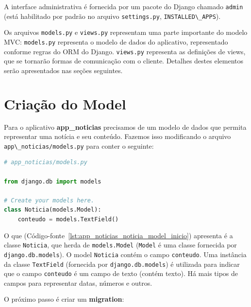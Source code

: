 \documentclass[brazil,a4paper,oneside,openright,parskip=full]{book}
\newcommand{\passthrough}[1]{#1}
\begin{document}
A interface administrativa é fornecida por um pacote do Django chamado
\passthrough{\lstinline!admin!} (está habilitado por padrão no arquivo
\passthrough{\lstinline!settings.py!},
\passthrough{\lstinline!INSTALLED\_APPS!}).

Os arquivos \passthrough{\lstinline!models.py!} e
\passthrough{\lstinline!views.py!} representam uma parte importante do
modelo MVC: \passthrough{\lstinline!models.py!} representa o modelo de
dados do aplicativo, representado conforme regras do ORM do Django.
\passthrough{\lstinline!views.py!} representa as definições de views,
que se tornarão formas de comunicação com o cliente. Detalhes destes
elementos serão apresentados nas seções seguintes.

\hypertarget{criauxe7uxe3o-do-model}{%
\section{Criação do Model}\label{criauxe7uxe3o-do-model}}

Para o aplicativo \textbf{app\_noticias} precisamos de um modelo de
dados que permita representar uma notícia e seu conteúdo. Fazemos isso
modificando o arquivo \passthrough{\lstinline!app\_noticias/models.py!}
para conter o seguinte:

\begin{lstlisting}[language=Python, caption={Código inicial do model Noticia}, label=lst:app_noticias_noticia_model_inicio]
# app_noticias/models.py

from django.db import models

# Create your models here.
class Noticia(models.Model):
    conteudo = models.TextField()
\end{lstlisting}

O que (Código-fonte~\ref{lst:app_noticias_noticia_model_inicio})
apresenta é a classe \passthrough{\lstinline!Noticia!}, que herda de
\passthrough{\lstinline!models.Model!} (\passthrough{\lstinline!Model!}
é uma classe fornecida por \passthrough{\lstinline!django.db.models!}).
O model \passthrough{\lstinline!Noticia!} contém o campo
\passthrough{\lstinline!conteudo!}. Uma instância da classe
\passthrough{\lstinline!TextField!} (fornecida por
\passthrough{\lstinline!django.db.models!}) é utilizada para indicar que
o campo \passthrough{\lstinline!conteudo!} é um campo de texto (contém
texto). Há mais tipos de campos para representar datas, números e
outros.

O próximo passo é criar um \textbf{migration}:
\end{document}
